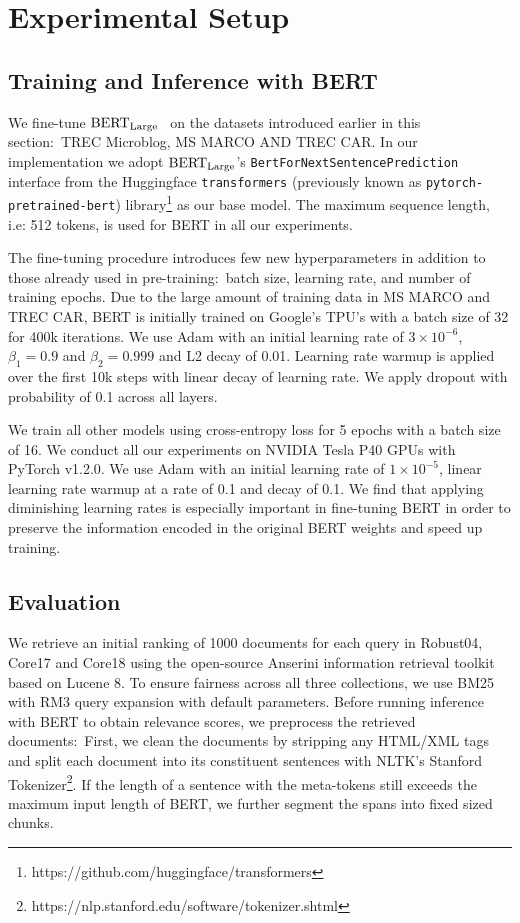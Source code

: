 \section{Experimental Setup}

\subsection{Training and Inference with BERT}

We fine-tune $ \textrm{BERT}_{\textrm{\scriptsize Large}} $~\cite{devlin2018bert} on the datasets introduced earlier in this section:\ TREC Microblog, MS MARCO AND TREC CAR.
In our implementation we adopt $ \textrm{BERT}_{\textrm{\scriptsize Large}} $'s \texttt{BertForNextSentencePrediction} interface from the Huggingface \texttt{transformers} (previously known as \texttt{pytorch-pretrained-bert}) library\footnote{https://github.com/huggingface/transformers} as our base model.
The maximum sequence length, i.e: 512 tokens, is used for BERT in all our experiments.

The fine-tuning procedure introduces few new hyperparameters in addition to those already used in pre-training:\ batch size, learning rate, and number of training epochs.
Due to the large amount of training data in MS MARCO and TREC CAR, BERT is initially trained on Google's TPU's with a batch size of 32 for 400k iterations.
We use Adam \cite{kingma2014adam} with an initial learning rate of $ 3 \times 10^{-6}$, $ \beta_1 = 0.9 $ and $ \beta_2 = 0.999 $ and L2 decay of 0.01.
Learning rate warmup is applied over the first 10k steps with linear decay of learning rate.
We apply dropout with probability of 0.1 across all layers.

We train all other models using cross-entropy loss for 5 epochs with a batch size of 16.
We conduct all our experiments on NVIDIA Tesla P40 GPUs with PyTorch v1.2.0.
We use Adam \cite{kingma2014adam} with an initial learning rate of $ 1 \times 10^{-5}$, linear learning rate warmup at a rate of 0.1 and decay of 0.1.
We find that applying diminishing learning rates is especially important in fine-tuning BERT in order to preserve the information encoded in the original BERT weights and speed up training.

\subsection{Evaluation}

We retrieve an initial ranking of 1000 documents for each query in Robust04, Core17 and Core18 using the open-source Anserini information retrieval toolkit based on Lucene 8.
To ensure fairness across all three collections, we use BM25 with RM3 query expansion with default parameters.
Before running inference with BERT to obtain relevance scores, we preprocess the retrieved documents:\
First, we clean the documents by stripping any HTML/XML tags and split each document into its constituent sentences with NLTK's Stanford Tokenizer\footnote{https://nlp.stanford.edu/software/tokenizer.shtml}.
If the length of a sentence with the meta-tokens still exceeds the maximum input length of BERT, we further segment the spans into fixed sized chunks.

